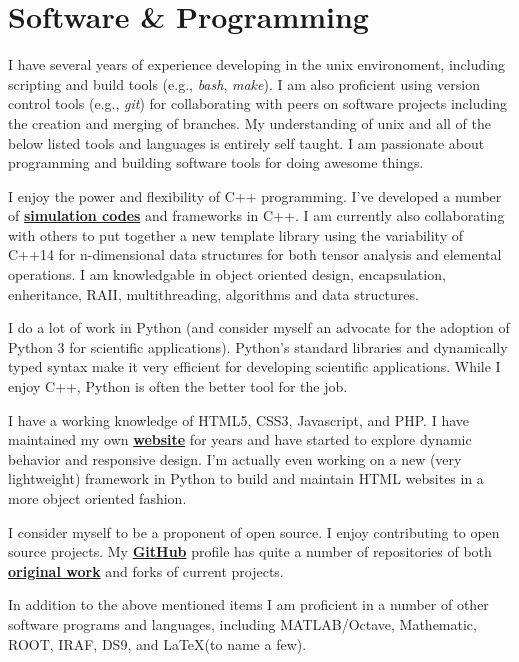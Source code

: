 

\section*{Software \& Programming}

\Descriptions
{
	\item[Unix >>] I have several years of experience developing in the unix environoment,
	including scripting and build tools (e.g., \textit{bash}, \textit{make}). I am also
	proficient using version control tools (e.g., \textit{git}) for collaborating with
	peers on software projects including the creation and merging of branches. My
	understanding of unix and all of the below listed tools and languages is entirely
	self taught. I am passionate about programming and building software tools for
	doing awesome things.

	\item[C++ >>] I enjoy the power and flexibility of C++ programming. I've developed a
	number of \href{http://github.com/glentner/Gaia-1.0}{\textbf{simulation codes}} and
	frameworks in C++. I am currently also collaborating with others to put together a
	new template library using the variability of C++14 for n-dimensional data structures
	for both tensor analysis and elemental operations. I am knowledgable in object oriented
	design, encapsulation, enheritance, RAII, multithreading, algorithms and data structures.

	\item[Python >>] I do a lot of work in Python (and consider myself an advocate for
	the adoption of Python 3 for scientific applications). Python's standard libraries
	and dynamically typed syntax make it very efficient for developing scientific
	applications. While I enjoy C++, Python is often the better tool for the job.

	\item[HTML >>] I have a working knowledge of HTML5, CSS3, Javascript, and PHP. I
	have maintained my own \href{http://glentner.github.io}{\textbf{website}} for years and
	have started to explore dynamic behavior and responsive design. I'm actually even
	working on a new (very lightweight) framework in Python to build and maintain HTML
	websites in a more object oriented fashion.

	\item[Open Source >>] I consider myself to be a proponent of open source. I enjoy
	contributing to open source projects. My \href{http://github.com/glentner}{\textbf{GitHub}}
	profile has quite a number of repositories of both
	\href{http://github.com/glentner/slipy}{\textbf{original work}} and forks of current projects.

	\item[Other Software >>] In addition to the above mentioned items I am proficient in
	a number of other software programs and languages, including MATLAB/Octave,
	Mathematic, ROOT, IRAF, DS9, and \LaTeX (to name a few).
}

\bigskip
